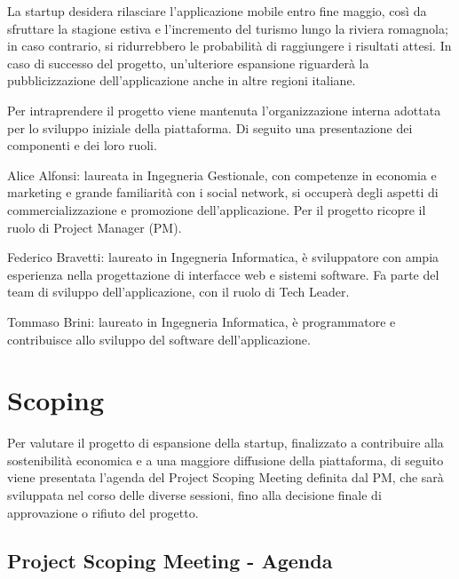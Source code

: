 \documentclass[11pt,a4paper]{article}
\begin{document}
{La startup desidera rilasciare l’applicazione mobile entro fine maggio, così da sfruttare la stagione estiva e l’incremento del turismo lungo la riviera romagnola; in caso contrario, si ridurrebbero le probabilità di raggiungere i risultati attesi. In caso di successo del progetto, un’ulteriore espansione riguarderà la pubblicizzazione dell’applicazione anche in altre regioni italiane.}

{Per intraprendere il progetto viene mantenuta l’organizzazione interna adottata per lo sviluppo iniziale della piattaforma. Di seguito una presentazione dei componenti e dei loro ruoli.}

{Alice Alfonsi: laureata in Ingegneria Gestionale, con competenze in economia e marketing e grande familiarità con i social network, si occuperà degli aspetti di commercializzazione e promozione dell’applicazione. Per il progetto ricopre il ruolo di Project Manager (PM).}

{Federico Bravetti: laureato in Ingegneria Informatica, è sviluppatore con ampia esperienza nella progettazione di interfacce web e sistemi software. Fa parte del team di sviluppo dell’applicazione, con il ruolo di Tech Leader.}

{Tommaso Brini: laureato in Ingegneria Informatica, è programmatore e contribuisce allo sviluppo del software dell’applicazione.}
\newpage
\section{\texorpdfstring{{Scoping}}{Scoping}}\label{h.rzay4rjovui3}

{Per valutare il progetto di espansione della startup, finalizzato a contribuire alla sostenibilità economica e a una maggiore diffusione della piattaforma, di seguito viene presentata l’agenda del Project Scoping Meeting definita dal PM, che sarà sviluppata nel corso delle diverse sessioni, fino alla decisione finale di approvazione o rifiuto del progetto.}

\subsection{\texorpdfstring{{Project Scoping Meeting - Agenda}}{Project Scoping Meeting - Agenda}}\label{h.6yk7wtwo0cm5}
\end{document}
